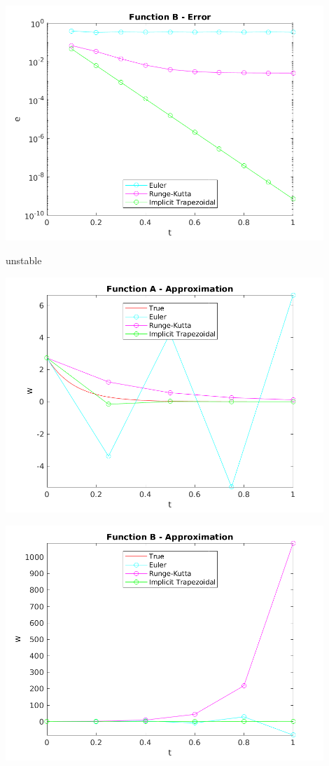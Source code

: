 \documentclass{article}
\begin{document}
\begin{center}
  \includegraphics[width=0.9\textwidth]{../output/b_compare_err.png}
  \label{fig:b_compare_err}
\end{center}


unstable

\begin{center}
  \includegraphics[width=0.9\textwidth]{../additional/unstable/a_compare_val.png}
  \label{fig:un_a_compare_val}
\end{center}

\begin{center}
  \includegraphics[width=0.9\textwidth]{../additional/unstable/b_compare_val.png}
  \label{fig:un_a_compare_err}
\end{center}





\newpage


\end{document}
